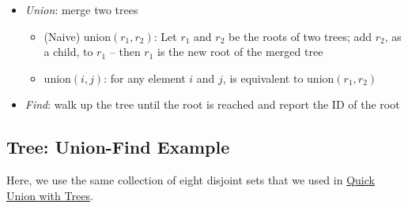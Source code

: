 \documentclass[
  10pt,
  english,
  letterpaper,
,tablecaptionabove
]{scrartcl}
\providecommand{\tightlist}{%
  \setlength{\itemsep}{0pt}\setlength{\parskip}{0pt}}
\begin{document}
\begin{itemize}
\tightlist
\item
  \emph{Union}: merge two trees

  \begin{itemize}
  \tightlist
  \item
    (Naive) union\((r_1, r_2)\): Let \(r_1\) and \(r_2\) be the roots of
    two trees; add \(r_2\), as a child, to \(r_1\) -- then \(r_1\) is
    the new root of the merged tree
  \item
    union\((i, j)\): for any element \(i\) and \(j\), is equivalent to
    union\((r_1, r_2)\)
  \end{itemize}
\item
  \emph{Find}: walk up the tree until the root is reached and report the
  ID of the root
\end{itemize}

\hypertarget{tree-union-find-example}{%
\subsection{Tree: Union-Find Example}\label{tree-union-find-example}}

Here, we use the same collection of eight disjoint sets that we used in
\protect\hyperlink{Quick-Union-with-Trees}{Quick Union with Trees}.
\end{document}
